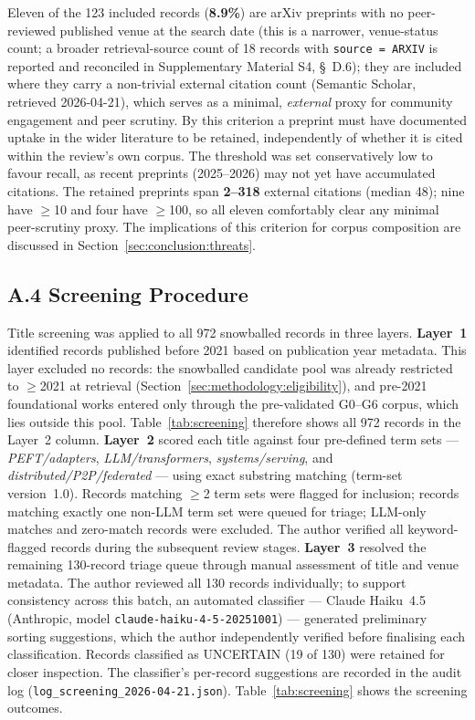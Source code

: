 Eleven of the 123 included records (\textbf{8.9\%}) are arXiv preprints with
no peer-reviewed published venue at the search date (this is a narrower,
venue-status count; a broader retrieval-source count of 18 records with
\texttt{source = ARXIV} is reported and reconciled in
Supplementary Material S4, \S~D.6); they are included where
they carry a non-trivial external citation count (Semantic Scholar, retrieved
2026-04-21), which serves as a minimal, \emph{external} proxy for
community engagement and peer scrutiny. By this criterion a preprint must have
documented uptake in the wider literature to be retained, independently of
whether it is cited within the review's own corpus. The threshold was set
conservatively low to favour recall, as recent preprints (2025--2026) may not
yet have accumulated citations. The retained preprints span \textbf{2--318}
external citations (median 48); nine have $\geq$10 and four have $\geq$100,
so all eleven comfortably clear any minimal peer-scrutiny proxy. The
implications of this criterion for corpus composition are discussed in
Section~\ref{sec:conclusion:threats}.

\subsection*{A.4 Screening Procedure}

Title screening was applied to all 972 snowballed records in three layers.
\textbf{Layer~1} identified records published before 2021 based on publication
year metadata. This layer excluded no records: the snowballed candidate pool
was already restricted to $\geq$2021 at retrieval
(Section~\ref{sec:methodology:eligibility}), and pre-2021 foundational works
entered only through the pre-validated G0--G6 corpus, which lies outside this
pool. Table~\ref{tab:screening} therefore shows all 972 records in the
Layer~2 column. \textbf{Layer~2} scored each title against four pre-defined
term sets --- \textit{PEFT/adapters}, \textit{LLM/transformers},
\textit{systems/serving}, and \textit{distributed/P2P/federated} --- using
exact substring matching (term-set version~1.0). Records matching $\geq$2
term sets were flagged for inclusion; records matching exactly one non-LLM
term set were queued for triage; LLM-only matches and zero-match records were
excluded. The author verified all keyword-flagged records during the
subsequent review stages. \textbf{Layer~3} resolved the remaining 130-record
triage queue through manual assessment of title and venue metadata. The author
reviewed all 130 records individually; to support consistency across this
batch, an automated classifier --- Claude Haiku~4.5 (Anthropic, model
\texttt{claude-haiku-4-5-20251001}) --- generated preliminary sorting
suggestions, which the author independently verified before finalising each
classification. Records classified as UNCERTAIN (19 of 130) were retained for
closer inspection. The classifier's per-record suggestions are recorded in the
audit log (\texttt{log\_screening\_2026-04-21.json}). Table~\ref{tab:screening}
shows the screening outcomes.

